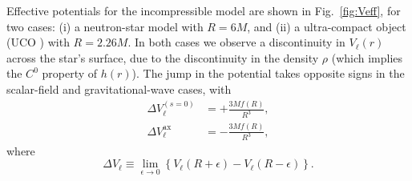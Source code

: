 \documentclass[aps,prd,longbibliography,reprint,twocolumn,amsmath,amssymb,amsfonts,showpacs,footnote,superscriptaddress]{revtex4-1}%
\begin{document}
Effective potentials for the incompressible model are shown in Fig.~\ref{fig:Veff}, for two cases: (i) a neutron-star model with $R = 6M$, and (ii) a ultra-compact object (UCO \cite{Macedo:2018yoi}) with $R = 2.26M$. %
In both cases we observe a discontinuity in $V_{\ell}(r)$ across the star's surface, due to the discontinuity in the density $\rho$ (which implies the $C^0$ property of $h(r)$). The jump in the potential takes opposite signs in the scalar-field and gravitational-wave cases, with
\begin{subequations}
\begin{align}
\Delta V_{\ell}^{(s=0)} &= + \frac{3Mf(R)}{R^3} , \\
\Delta V_{\ell}^{\text{ax}} &= - \frac{3Mf(R)}{R^3} ,
\end{align}
\end{subequations}
where
\begin{equation}
\Delta V_{\ell} \equiv \lim_{\epsilon \rightarrow 0} \left\{ V_{\ell}(R + \epsilon) - V_{\ell}(R - \epsilon) \right\} . \label{def:DeltaV}
\end{equation}
\end{document}
